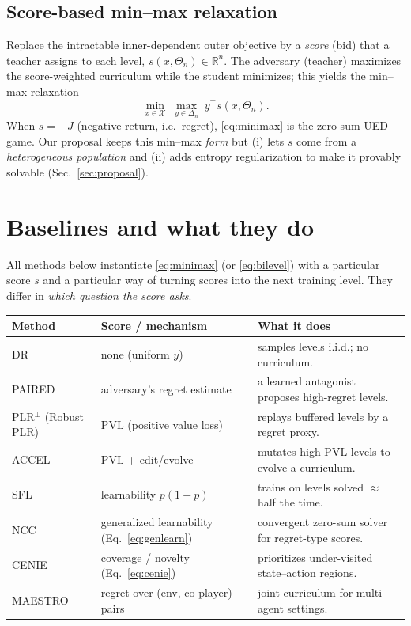 \documentclass[11pt]{article}
\newcommand{\reals}{\mathbb{R}}
\newcommand{\simplex}{\Delta}
\newcommand{\levelset}{\Theta}     %
\newcommand{\param}{x}             %
\newcommand{\paramset}{\mathcal{X}}
\newcommand{\dist}{y}              %
\newcommand{\score}{s}             %
\newcommand{\pvl}{\mathrm{PVL}}
\begin{document}
\subsection{Score-based min--max relaxation}
Replace the intractable inner-dependent outer objective by a \emph{score} (bid) that a teacher assigns to each level, $\score(\param,\levelset_n)\in\reals^n$. The adversary (teacher) maximizes the score-weighted curriculum while the student minimizes; this yields the min--max relaxation
\begin{equation}
  \min_{\param\in\paramset}\;\max_{\dist\in\simplex_n}\;
  \dist^{\top}\score(\param,\levelset_n).
  \label{eq:minimax}
\end{equation}
When $\score=-J$ (negative return, i.e.\ regret), \eqref{eq:minimax} is the zero-sum UED game. Our proposal keeps this min--max \emph{form} but (i) lets $\score$ come from a \emph{heterogeneous population} and (ii) adds entropy regularization to make it provably solvable (Sec.~\ref{sec:proposal}).

\section{Baselines and what they do}
\label{sec:baselines}

All methods below instantiate \eqref{eq:minimax} (or \eqref{eq:bilevel}) with a particular score $\score$ and a particular way of turning scores into the next training level. They differ in \emph{which question the score asks}.

\begin{table}[h]
\centering
\small
\begin{tabular}{@{}lll@{}}
\toprule
\textbf{Method} & \textbf{Score / mechanism} & \textbf{What it does} \\
\midrule
DR & none (uniform $\dist$) & samples levels i.i.d.; no curriculum. \\
PAIRED & adversary's regret estimate & a learned antagonist proposes high-regret levels. \\
PLR$^\perp$ (Robust PLR) & $\pvl$ (positive value loss) & replays buffered levels by a regret proxy. \\
ACCEL & $\pvl$ + edit/evolve & mutates high-$\pvl$ levels to evolve a curriculum. \\
SFL & learnability $p(1-p)$ & trains on levels solved $\approx$ half the time. \\
NCC & generalized learnability (Eq.~\eqref{eq:genlearn}) & convergent zero-sum solver for regret-type scores. \\
CENIE & coverage / novelty (Eq.~\eqref{eq:cenie}) & prioritizes under-visited state--action regions. \\
MAESTRO & regret over (env, co-player) pairs & joint curriculum for multi-agent settings. \\
\bottomrule
\end{tabular}
\end{table}
\end{document}
